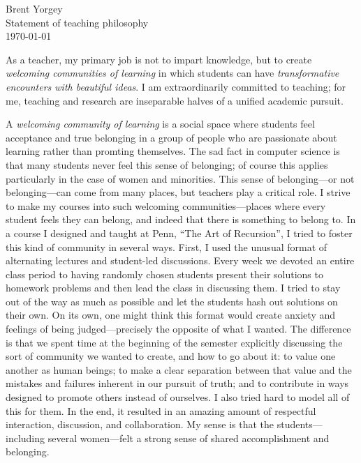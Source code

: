 \documentclass{article}
\begin{document}
\noindent Brent Yorgey \\
Statement of teaching philosophy \\
\today
\bigskip

As a teacher, my primary job is not to impart knowledge, but to create
\emph{welcoming communities of learning} in which students can have
\emph{transformative encounters with beautiful ideas}.  I am
extraordinarily committed to teaching; for me, teaching and research
are inseparable halves of a unified academic pursuit.

A \emph{welcoming community of learning} is a social space where
students feel acceptance and true belonging in a group of people who
are passionate about learning rather than promting themselves.  The
sad fact in computer science is that many students never feel this
sense of belonging; of course this applies particularly in the case of
women and minorities. This sense of belonging---or not belonging---can
come from many places, but teachers play a critical role.  I strive to
make my courses into such welcoming communities---places where every
student feels they can belong, and indeed that there is something to
belong to.  In a course I designed and taught at Penn, ``The Art of
Recursion'', I tried to foster this kind of community in several ways.
First, I used the unusual format of alternating lectures and
student-led discussions. Every week we devoted an entire class period
to having randomly chosen students present their solutions to homework
problems and then lead the class in discussing them.  I tried to stay
out of the way as much as possible and let the students hash out
solutions on their own.  On its own, one might think this format would
create anxiety and feelings of being judged---precisely the opposite
of what I wanted.  The difference is that we spent time at the
beginning of the semester explicitly discussing the sort of community
we wanted to create, and how to go about it: to value one another as
human beings; to make a clear separation between that value and the
mistakes and failures inherent in our pursuit of truth; and to
contribute in ways designed to promote others instead of ourselves. I
also tried hard to model all of this for them. In the end, it resulted
in an amazing amount of respectful interaction, discussion, and
collaboration.  My sense is that the students---including several
women---felt a strong sense of shared accomplishment and belonging.

\end{document}
